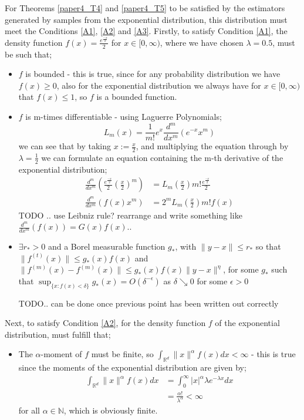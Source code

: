 \documentclass{report}
\begin{document}
For Theorems \ref{paper4_T4} and \ref{paper4_T5} to be satisfied by the estimators generated by samples from the exponential distribution, this distribution must meet the Conditions \ref{A1}, \ref{A2} and \ref{A3}. 
Firstly, to satisfy Condition \ref{A1}, the density function $f(x) =  \frac{e^{\frac{-x}{2}}}{2}$ for $x \in [0, \infty)$, where we have chosen $\lambda = 0.5$, must be such that;
\begin{itemize}
\item $f$ is bounded - this is true, since for any probability distribution we have $f(x) \geq 0$, also for the exponential distribution we always have for $x \in [0, \infty)$ that $f(x) \leq 1$, so $f$ is a bounded function.

\item $f$ is m-times differentiable - using Laguerre Polynomials;
\begin{equation}
L_{m}(x) = \frac{1}{m!} e^x \frac{d^m}{dx^m}(e^{-x} x^m) \nonumber
\end{equation}
we can see that by taking $x := \frac{x}{2}$, and multiplying the equation through by $\lambda = \frac{1}{2}$ we can formulate an equation containing the m-th derivative of the exponential distribution;
\begin{align*}
\frac{d^m}{dx^m}\left(\frac{e^{\frac{-x}{2}}}{2} \left(\frac{x}{2}\right)^m\right) &= L_{m}\left(\frac{x}{2}\right) m! \frac{e^{\frac{-x}{2}}}{2} \\
\frac{d^m}{dx^m}(f(x) x^m) &=  2^m L_{m}\left(\frac{x}{2}\right) m! f(x)
\end{align*}
TODO .. use Leibniz rule? rearrange and write something like $\frac{d^m}{dx^m}(f(x)) = G(x) f(x)$..

\item $\exists r_{*} > 0$ and a Borel measurable function $g_{*}$, with $\|y-x\| \leq r_{*}$ so that $\|f^{(t)}(x)\| \leq g_{*}(x) f(x)$ and $\|f^{(m)}(x) - f^{(m)}(x)\| \leq g_{*}(x) f(x)\|y - x\|^{\eta}$, for some $g_{*}$ such that $\sup_{\{x : f(x) < \delta\}} g_{*}(x) = O(\delta^{-\epsilon})$ as $\delta \searrow 0$ for some $\epsilon >0$

TODO.. can be done once previous point has been written out correctly
\end{itemize}

Next, to satisfy Condition \ref{A2}, for the density function $f$ of the exponential distribution, must fulfill that;
\begin{itemize}
\item The $\alpha$-moment of $f$ must be finite, so $\int_{\mathbb{R}^{d}} \| x \|^{\alpha} f(x) dx < \infty$ - this is true since the moments of the exponential distribution are given by;
\begin{align*}
\int_{\mathbb{R}^{d}} \| x \|^{\alpha} f(x) dx &= \int_{0}^{\infty} | x |^{\alpha} \lambda e^{-\lambda x} dx\\
&= \frac{\alpha !}{\lambda ^{\alpha}} < \infty
\end{align*}
for all $\alpha \in \mathbb{N}$, which is obviously finite.
\end{itemize}
\end{document}
